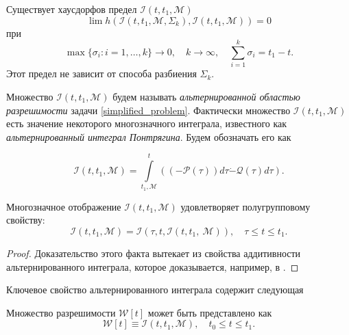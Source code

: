 \begin{lemma}\label{lemma_haus_limit}
    Существует хаусдорфов предел \( \mathcal{I}(t, t_1, \mathcal{M}) \)
    \begin{equation*}
        \lim h \left( \mathcal{I}(t, t_1, \mathcal{M}, \Sigma_k), \mathcal{I}(t, t_1, \mathcal{M})
         \right) = 0
    \end{equation*}
    при 
    \begin{equation*}
        \max\{\sigma_i: i = 1,\dots, k \} \to 0, \quad k \to \infty, \quad \sum_{i = 1}^k \sigma_i 
         = t_1 - t. 
    \end{equation*}
    Этот предел не зависит от способа разбиения \( \Sigma_k \).
\end{lemma}
Множество \( \mathcal{I}(t, t_1, \mathcal{M}) \) будем называть \emph{альтернированной областью 
 разрешимости} задачи \eqref{simplified_problem}. Фактически множество \( \mathcal{I}(t, t_1, 
 \mathcal{M}) \) есть значение некоторого многозначного интеграла, известного как 
 \emph{альтернированный интеграл Понтрягина}. Будем обозначать его как

\begin{equation}
    \mathcal{I}(t, t_1, \mathcal{M}) = \int\limits_{t_1, \mathcal{M}}^t \left( (-\mathcal{P}(\tau))
     d\tau \dot{-} \mathcal{Q}(\tau) d\tau \right).
\end{equation}


\begin{lemma}\label{lemma_semigroup_property}
    Многозначное отображение \( \mathcal{I}(t, t_1, \mathcal{M}) \) удовлетворяет полугрупповому
     свойству:
    \begin{equation}
        \mathcal{I}(t, t_1, \mathcal{M}) = \mathcal{I}(\tau, t, \mathcal{I}(t, t_1,\
         \mathcal{M})), \quad  \tau \le t \le t_1.
    \end{equation}
\end{lemma}
\begin{proof}
    Доказательство этого факта вытекает из свойства аддитивности альтернированного интеграла,
     которое доказывается, например, в \cite{lin_dif_chasing}.
\end{proof}

Ключевое свойство альтернированного интеграла содержит следующая 
\begin{theorem}
    Множество разрешимости \( \mathcal{W}[t] \) может быть представлено как 
    \begin{equation}
        \mathcal{W}[t] \equiv \mathcal{I}(t, t_1, \mathcal{M}), \quad
         t_0 \le t \le t_1.
    \end{equation}
\end{theorem}

